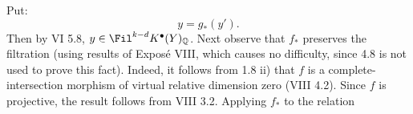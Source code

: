 Put:
\[
  y=g_*(y').
\]
Then by VI 5.8, \(y\in\Fil^{k-d}K^{\bullet}(Y)_{\mathbb Q}\). Next observe that \(f_*\) preserves the filtration (using results of Exposé VIII, which causes no difficulty, since 4.8 is not used to prove this fact). Indeed, it follows from 1.8 ii) that \(f\) is a complete-intersection morphism of virtual relative dimension zero (VIII 4.2). Since \(f\) is projective, the result follows from VIII 3.2. Applying \(f_*\) to the relation

